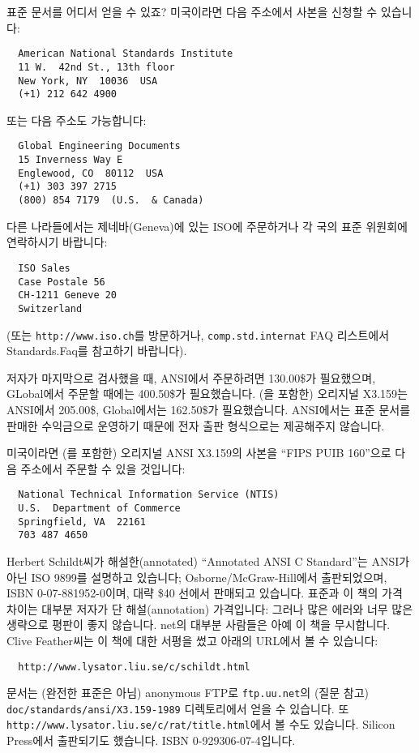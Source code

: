 \begin{faq}
	표준 문서를 어디서 얻을 수 있죠?
\A
	미국이라면 다음 주소에서 사본을 신청할 수 있습니다:
\begin{verbatim}
  American National Standards Institute
  11 W.  42nd St., 13th floor
  New York, NY  10036  USA
  (+1) 212 642 4900
\end{verbatim}
	\noindent 또는 다음 주소도 가능합니다:
\begin{verbatim}
  Global Engineering Documents
  15 Inverness Way E
  Englewood, CO  80112  USA
  (+1) 303 397 2715
  (800) 854 7179  (U.S.  & Canada)
\end{verbatim}
	다른 나라들에서는 제네바(Geneva)에 있는 ISO에 주문하거나
	각 국의 표준 위원회에 연락하시기 바랍니다:
\begin{verbatim}
  ISO Sales
  Case Postale 56
  CH-1211 Geneve 20
  Switzerland
\end{verbatim}
	(또는 \verb+http://www.iso.ch+를 방문하거나, \verb+comp.std.internat+
	FAQ 리스트에서 Standards.Faq를 참고하기 바랍니다).

	저자가 마지막으로 검사했을 때, ANSI에서 주문하려면 130.00\$가
	필요했으며, GLobal에서 주문할 때에는 400.50\$가 필요했습니다.
	(\cite{rationale}을 포함한) 오리지널 X3.159는 ANSI에서 205.00\$,
	Global에서는 162.50\$가 필요했습니다.  ANSI에서는 표준 문서를
	판매한 수익금으로 운영하기 때문에 전자 출판 형식으로는 제공해주지
	않습니다.

	미국이라면 (\cite{rationale}를 포함한) 오리지널 ANSI X3.159의 사본을
	``FIPS PUIB 160''으로 다음 주소에서 주문할 수 있을 것입니다:
\begin{verbatim}
  National Technical Information Service (NTIS)
  U.S.  Department of Commerce
  Springfield, VA  22161
  703 487 4650
\end{verbatim}
	Herbert Schildt씨가 해설한(annotated) ``Annotated ANSI C Standard''는
	ANSI가 아닌 ISO 9899를 설명하고 있습니다; Osborne/McGraw-Hill에서
	출판되었으며, ISBN 0-07-881952-0이며, 대략 \$40 선에서 판매되고
	있습니다.  표준과 이 책의 가격 차이는 대부분 저자가 단 
	해설(annotation) 가격입니다: 그러나 많은 에러와 너무 많은 생략으로
	평판이 좋지 않습니다.  net의 대부분 사람들은 아예 이 책을 무시합니다.
	Clive Feather씨는 이 책에 대한 서평을 썼고 아래의 URL에서 볼 수
	있습니다:
\begin{verbatim}
  http://www.lysator.liu.se/c/schildt.html
\end{verbatim}

	\cite{rationale} 문서는 (완전한 표준은 아님) anonymous FTP로
	\verb+ftp.uu.net+의 (질문  참고)
	\verb+doc/standards/ansi/X3.159-1989+ 디렉토리에서
        얻을 수 있습니다.
	또 \verb+http://www.lysator.liu.se/c/rat/title.html+에서
        볼 수도 있습니다.  Silicon Press에서 출판되기도 했습니다.  
	ISBN 0-929306-07-4입니다.


\end{faq}
